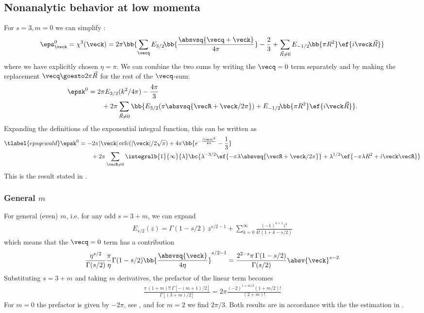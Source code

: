 \subsection{Nonanalytic behavior at low momenta}
For $s=3, m=0$ we can simplify :
\begin{align}
    \eps^0_\veck = \chi^3(\veck) = 2\pi \bb{ \sum_{\vecq} E_{3/2}\!\bb{\frac{\absvsq{\vecq+\veck}}{4\pi}} - \frac{2}{3} + \sum_{\vec{R}\ne 0} E_{-1/2}\!\bb{\pi R^2} \ef{i \veck \vec{R}} }
\end{align}
where we have explicitly chosen $\eta = \pi$. We can combine the two sums by writing the $\vecq=0$ term separately and by making the replacement $\vecq \goesto 2\pi\vec{R}$ for the rest of the $\vecq$-sum:
\begin{align}
    \epsk^0 &= 2\pi  E_{3/2}(k^2/4\pi) - \frac{4\pi}{3}\\
                 &\qquad+ 2\pi\sum_{\vec{R}\ne 0} \bb{ E_{3/2}( \pi \absvsq{\vecR+\veck/2\pi} ) + E_{-1/2}\!\bb{\pi R^2} \ef{i \veck \vec{R}} }.
\end{align}
Expanding the definitions of the exponential integral function, this can be written as
\begin{align} \tlabel{epsqewald}
    \epsk^0 &= -2 \pi  |\veck| \operatorname{erfc}( |\veck|/2 \sqrt{\pi} ) + 4 \pi \bb{ e^{-\frac{|\veck|^2}{4 \pi }}-\frac{1 }{3} } \\
            &\qquad+ 2\pi \sum_{\vecR\ne 0} \integralb{1}{\infty}{\lambda} \bc{ \lambda^{-3/2} \ef{-\pi\lambda\absvsq{\vecR+\veck/2\pi}} + \lambda^{1/2} \ef{-\pi \lambda R^2+ i\veck \vecR} }
\end{align}
This is the result stated in .

\subsubsection{General \texorpdfstring{$m$}{m}}
For general (even) $m$, i.e. for any odd $s=3+m$, we can expand
\begin{align}
    E_{s/2}(z) = \Gamma(1-s/2)\, z^{s/2-1} + \sum_{k=0}^\infty \frac{(-1)^{k+1} z^k}{k! (1+k-s/2)}
\end{align}
which means that the $\vecq=0$ term has a contribution
\begin{align}
\frac{\eta^{s/2}}{\Gamma(s/2)} \frac{\pi}{\eta} \Gamma(1-s/2) \bb{\frac{\absvsq{\veck}}{4\eta}}^{s/2-1} = \frac{2^{2-s}\pi\, \Gamma(1-s/2)}{\Gamma(s/2)} \absv{\veck}^{s-2}
\end{align}
Substituting $s=3+m$ and taking $m$ derivatives, the prefactor of the linear term becomes
\begin{align}
    \frac{\pi\, (1+m)!! \,\Gamma[-(m+1)/2]}{\Gamma[(3+m)/2]} = 2\pi \frac{(-2)^{1+m/2} (1+m/2)!}{(2+m)!}
\end{align}
For $m=0$ the prefactor is given by $-2\pi$, see , and for $m=2$ we find $2\pi/3$. Both results are in accordance with the the estimation in .
